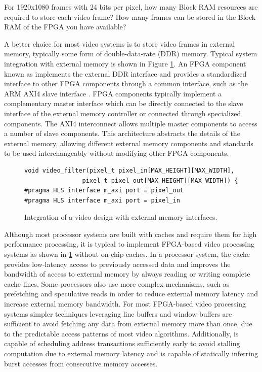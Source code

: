 \begin{exercise}
For 1920x1080 frames with 24 bits per pixel, how many Block RAM resources are required to store each video frame?  How many frames can be stored in the Block RAM of the FPGA you have available?
\end{exercise}

A better choice for most video systems is to store video frames in external memory, typically some form of double-data-rate (DDR) memory.  Typical system integration with external memory is shown in Figure \ref{fig:video:DDR_interface}.   An FPGA component known as  implements the external DDR interface and provides a standardized interface to other FPGA components through a common interface, such as the ARM AXI4 slave interface \cite{ARMAXI4}.   FPGA components typically implement a complementary master interface which can be directly connected to the slave interface of the external memory controller or connected through specialized  components.  The AXI4 interconnect allows multiple master components to access a number of slave components.  This architecture abstracts the details of the external memory, allowing different external memory components and standards to be used interchangeably without modifying other FPGA components.   

\begin{figure}
\centering
\framebox{}
\begin{lstlisting}
void video_filter(pixel_t pixel_in[MAX_HEIGHT][MAX_WIDTH],
				pixel_t pixel_out[MAX_HEIGHT][MAX_WIDTH]) {
#pragma HLS interface m_axi port = pixel_out
#pragma HLS interface m_axi port = pixel_in
\end{lstlisting}
\caption{Integration of a video design with external memory interfaces.}\label{fig:video:DDR_interface}
\end{figure}

Although most processor systems are built with caches and require them for high performance processing, it is typical to implement FPGA-based video processing systems as shown in \ref{fig:video:DDR_interface} without on-chip caches.  In a processor system, the cache provides low-latency access to previously accessed data and improves the bandwidth of access to external memory by always reading or writing complete cache lines. Some processors also use more complex mechanisms, such as prefetching and speculative reads in order to reduce external memory latency and increase external memory bandwidth.  For most FPGA-based video processing systems simpler techniques leveraging line buffers and window buffers are sufficient to avoid fetching any data from external memory more than once, due to the predictable access patterns of most video algorithms.  Additionally, \VHLS is capable of scheduling address transactions sufficiently early to avoid stalling computation due to external memory latency and is capable of statically inferring burst accesses from consecutive memory accesses.

